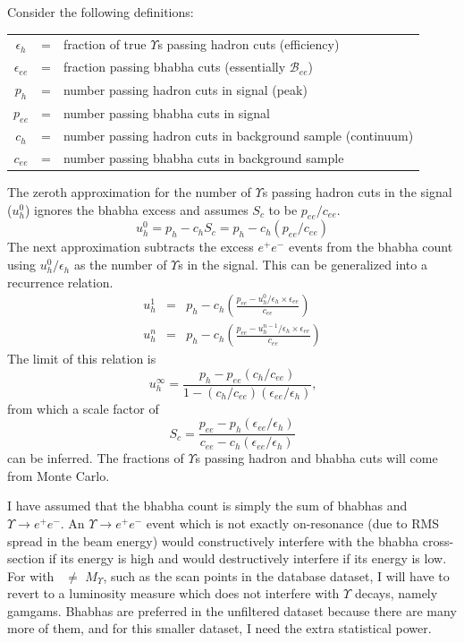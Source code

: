 Consider the following definitions:
\begin{center}
  \begin{tabular}{c c l}
    $\epsilon_h$ &=& fraction of true $\Upsilon$s passing hadron cuts
    (efficiency) \\
    $\epsilon_{ee}$ &=& fraction passing bhabha cuts (essentially
    $\mathcal{B}_{ee}$) \\
    $p_h$ &=& number passing hadron cuts in signal (peak) \\
    $p_{ee}$ &=& number passing bhabha cuts in signal \\
    $c_h$ &=& number passing hadron cuts in background sample (continuum) \\
    $c_{ee}$ &=& number passing bhabha cuts in background sample \\
  \end{tabular}
\end{center}
The zeroth approximation for the number of $\Upsilon$s passing hadron
cuts in the signal ($u_h^0$) ignores the bhabha excess and assumes
$S_c$ to be $p_{ee}/c_{ee}$.
\begin{equation}
  u_h^0 = p_h - c_h S_c = p_h - c_h (p_{ee}/c_{ee})
\end{equation}
The next approximation subtracts the excess $e^+e^-$ events from the
bhabha count using $u_h^0/\epsilon_h$ as the number of $\Upsilon$s in
the signal.  This can be generalized into a recurrence relation.
\begin{eqnarray}
  u_h^1 &=& p_h - c_h \left(\frac{p_{ee} - u_h^0/\epsilon_h \times
  \epsilon_{ee}}{c_{ee}}\right) \\
  u_h^n &=& p_h - c_h \left(\frac{p_{ee} - u_h^{n-1}/\epsilon_h \times
  \epsilon_{ee}}{c_{ee}}\right)
\end{eqnarray}
The limit of this relation is
\begin{equation}
  u_h^\infty = \frac{p_h - p_{ee} (c_h / c_{ee})}{1 -
    (c_h/c_{ee})(\epsilon_{ee}/\epsilon_h)}\mbox{,}
\end{equation}
from which a scale factor of
\begin{equation}
  S_c = \frac{p_{ee} - p_h (\epsilon_{ee}/\epsilon_h)}{c_{ee} - c_h
    (\epsilon_{ee}/\epsilon_h)}
\end{equation}
can be inferred.  The fractions of $\Upsilon$s passing hadron and
bhabha cuts will come from Monte Carlo.

I have assumed that the bhabha count is simply the sum of bhabhas and
$\Upsilon \to e^+e^-$.  An $\Upsilon \to e^+e^-$ event which is not
exactly on-resonance (due to RMS spread in the beam energy) would
constructively interfere with the bhabha cross-section if its energy
is high and would destructively interfere if its energy is low.  For
with \ebeam\ $\ne$ $M_\Upsilon$, such as the scan points in the
database dataset, I will have to revert to a luminosity measure which
does not interfere with $\Upsilon$ decays, namely gamgams.  Bhabhas
are preferred in the unfiltered dataset because there are many more of
them, and for this smaller dataset, I need the extra statistical
power.

